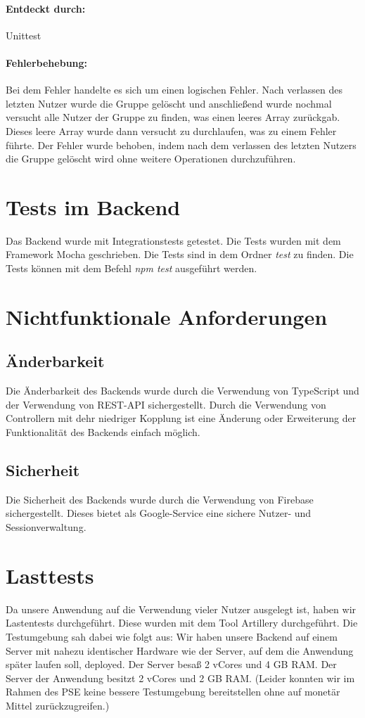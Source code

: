 \documentclass{qualitätssicherungsheft}
\begin{document}
\paragraph*{Entdeckt durch:} Unittest
\paragraph*{Fehlerbehebung:} Bei dem Fehler handelte es sich um einen logischen Fehler. Nach verlassen des letzten Nutzer wurde die Gruppe gelöscht und anschließend wurde nochmal versucht alle Nutzer der Gruppe zu finden, was einen leeres Array zurückgab. Dieses leere Array wurde dann versucht zu durchlaufen, was zu einem Fehler führte. Der Fehler wurde behoben, indem nach dem verlassen des letzten Nutzers die Gruppe gelöscht wird ohne weitere Operationen durchzuführen.

\section{Tests im Backend}
Das Backend wurde mit Integrationstests getestet. Die Tests wurden mit dem Framework Mocha geschrieben. 
Die Tests sind in dem Ordner \textit{test} zu finden. Die Tests können mit dem Befehl \textit{npm test} ausgeführt werden.

\section{Nichtfunktionale Anforderungen}
\subsection{Änderbarkeit}
Die Änderbarkeit des Backends wurde durch die Verwendung von TypeScript und der Verwendung von REST-API sichergestellt.
Durch die Verwendung von Controllern mit dehr niedriger Kopplung ist eine Änderung oder Erweiterung der Funktionalität des Backends einfach möglich.

\subsection{Sicherheit}
Die Sicherheit des Backends wurde durch die Verwendung von Firebase sichergestellt. 
Dieses bietet als Google-Service eine sichere Nutzer- und Sessionverwaltung.

\section{Lasttests}
Da unsere Anwendung auf die Verwendung vieler Nutzer ausgelegt ist, haben wir Lastentests durchgeführt.
Diese wurden mit dem Tool Artillery durchgeführt.
Die Testumgebung sah dabei wie folgt aus:
Wir haben unsere Backend auf einem Server mit nahezu identischer Hardware wie der Server, auf dem die Anwendung später laufen soll, deployed.
Der Server besaß 2 vCores und 4 GB RAM.
Der Server der Anwendung besitzt 2 vCores und 2 GB RAM.
(Leider konnten wir im Rahmen des PSE keine bessere Testumgebung bereitstellen ohne auf monetär Mittel zurückzugreifen.)
\end{document}
